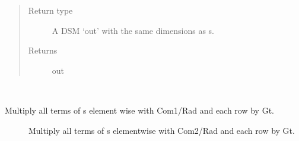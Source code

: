 \documentclass[letterpaper,10pt,english]{sphinxmanual}
\begin{document}
\begin{fulllineitems}
\begin{fulllineitems}
\begin{sphinxVerbatim}[commandchars=\\\{\}]
\PYG{p}{[}\PYG{p}{]}\PYG{p}{[}\PYG{p}{]}\PYG{p}{[}\PYG{p}{]}\PYG{p}{[}\PYG{p}{]}\PYG{p}{[}\PYG{p}{]}
\PYG{p}{[}\PYG{p}{]}\PYG{p}{[}\PYG{p}{]}\PYG{p}{[}\PYG{p}{]}\PYG{p}{[}\PYG{p}{]}\PYG{p}{[}\PYG{p}{]}
\end{sphinxVerbatim}
\begin{quote}\begin{description}
\item[{Return type}] \leavevmode
A DSM ‘out’ with the same dimensions as s.

\item[{Returns}] \leavevmode
out

\end{description}\end{quote}

\end{fulllineitems}


\begin{fulllineitems}
\label{\detokenize{index:DictionarySparseMatrix.DS.gain_phase_rad_ref_mul_add}}~\begin{description}
\item[{Multiply all terms of s element wise with Com1/Rad and each row by Gt.}] \leavevmode
Multiply all terms of s elementwise with Com2/Rad and each row by Gt.


\end{description}
\end{fulllineitems}
\end{fulllineitems}
\end{document}
